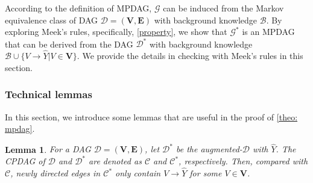 \documentclass{article} %
\newtheorem{lemma}{Lemma}[section]
\begin{document}

According to the definition of MPDAG, $\mathcal{G}$ can be induced from the Markov equivalence class of DAG $\mathcal{D}=(\mathbf{V}, \mathbf{E})$ with background knowledge $\mathcal{B}$. By exploring Meek's rules, specifically, \ref{property}, we show that $\mathcal{G^*}$ is an MPDAG that can be derived from the DAG $\mathcal{D^*}$ with background knowledge $\mathcal{B} \cup \{V \rightarrow \hat{Y}|V \in \mathbf{V}\}$. We provide the details in checking with Meek's rules in this section.

\subsubsection{Technical lemmas}

In this section, we introduce some lemmas that are useful in the proof of \cref{theo: mpdag}.

\begin{lemma} \label{lem: cpdag}
    For a DAG $\mathcal{D}=(\mathbf{V}, \mathbf{E})$, let $\mathcal{D^{*}}$ be the augmented-$\mathcal{D}$ with $\hat{Y}$. The CPDAG of $\mathcal{D}$ and $\mathcal{D^{*}}$ are denoted as $\mathcal{C}$ and $\mathcal{C^{*}}$, respectively. Then, compared with $\mathcal{C}$, newly directed edges in $\mathcal{C^{*}}$ only contain $V \rightarrow \hat{Y}$ for some $V \in \mathbf{V}$.
    
\end{lemma}
\end{document}
